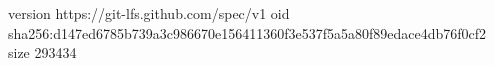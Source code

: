 version https://git-lfs.github.com/spec/v1
oid sha256:d147ed6785b739a3c986670e156411360f3e537f5a5a80f89edace4db76f0cf2
size 293434
